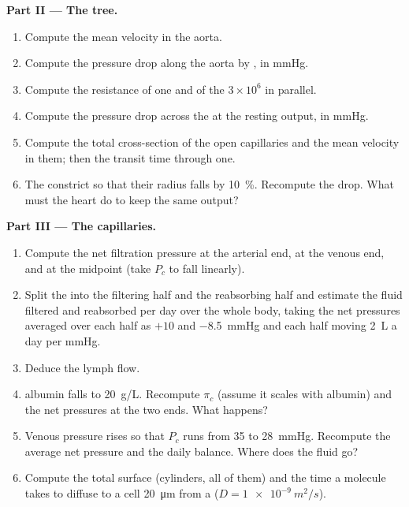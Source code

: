 \begin{problem}
\medskip
\noindent\textbf{Part II --- The tree.}
\begin{enumerate}[resume]
  \item Compute the mean velocity in the aorta.
  \item Compute the pressure drop along the aorta by , in mmHg.
  \item Compute the resistance of one  and of the $3\times
        10^{6}$ in parallel.
  \item Compute the pressure drop across the  at the
        resting output, in mmHg.
  \item Compute the total cross-section of the open capillaries and
        the mean velocity in them; then the transit time through one.
  \item The  constrict so that their radius falls by
        \qty{10}{\%}. Recompute the drop. What must the heart do to
        keep the same output?
\end{enumerate}

\medskip
\noindent\textbf{Part III --- The capillaries.}
\begin{enumerate}[resume]
  \item Compute the net filtration pressure at the arterial end, at
        the venous end, and at the midpoint (take $P_c$ to fall
        linearly).
  \item Split the  into the filtering half and the
        reabsorbing half and estimate the fluid filtered and
        reabsorbed per day over the whole body, taking the net
        pressures averaged over each half as $+10$ and
        \qty{-8.5}{mmHg} and each half moving \qty{2}{L} a day per
        mmHg.
  \item Deduce the lymph flow.
  \item {} albumin falls to \qty{20}{g/L}. Recompute $\pi_c$
        (assume it scales with albumin) and the net pressures at the
        two ends. What happens?
  \item Venous pressure rises so that $P_c$ runs from 35 to
        \qty{28}{mmHg}. Recompute the average net pressure and the
        daily balance. Where does the fluid go?
  \item Compute the total  surface (cylinders, all of
        them) and the time a molecule takes to diffuse to a cell
        \qty{20}{\micro m} from a  ($D = \qty{1e-9}{m^2/s}$).
\end{enumerate}


\end{problem}
